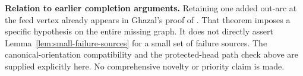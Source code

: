 \par\medskip\noindent\textbf{Relation to earlier completion arguments.}\quad 
Retaining one added out-arc at the feed vertex already appears in
Ghazal's proof of \cite[Theorem~3]{Ghazal2013}. That theorem
imposes a specific hypothesis on the entire missing graph. It does
not directly assert Lemma~\ref{lem:small-failure-sources} for a small
set of failure sources. The canonical-orientation compatibility and
the protected-head path check above are supplied explicitly here.
No comprehensive novelty or priority claim is made.
